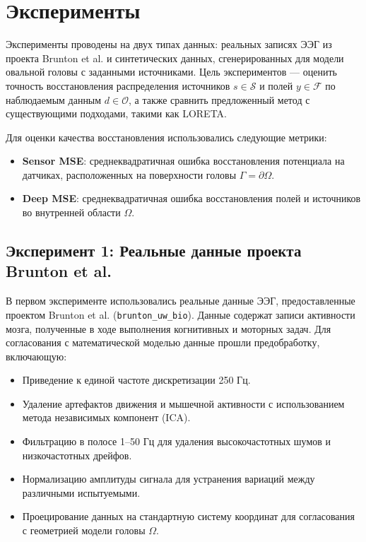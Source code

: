 \documentclass[sn-mathphys-num]{bst/sn-jnl}
\theoremstyle{thmstylethree}
\theoremstyle{thmstyletwo}
\theoremstyle{thmstyleone}
\begin{document}
\section{Эксперименты}
\label{sec:experiments}

Эксперименты проводены на двух типах данных: реальных записях ЭЭГ из проекта Brunton et al. и синтетических данных, сгенерированных для модели овальной головы с заданными источниками. Цель экспериментов --- оценить точность восстановления распределения источников $s \in \mathcal{S}$ и полей $y \in \mathcal{F}$ по наблюдаемым данным $d \in \mathcal{O}$, а также сравнить предложенный метод с существующими подходами, такими как LORETA.

Для оценки качества восстановления использовались следующие метрики:
\begin{itemize}
    \item \textbf{Sensor MSE}: среднеквадратичная ошибка восстановления потенциала на датчиках, расположенных на поверхности головы $\Gamma = \partial\Omega$.
    \item \textbf{Deep MSE}: среднеквадратичная ошибка восстановления полей и источников во внутренней области $\Omega$.
\end{itemize}

\subsection{Эксперимент 1: Реальные данные проекта Brunton et al.}
\label{subsec:exp1}

В первом эксперименте использовались реальные данные ЭЭГ, предоставленные проектом Brunton et al. (\texttt{brunton\_uw\_bio}). Данные содержат записи активности мозга, полученные в ходе выполнения когнитивных и моторных задач. Для согласования с математической моделью данные прошли предобработку, включающую:

\begin{itemize}
    \item Приведение к единой частоте дискретизации 250 Гц.
    \item Удаление артефактов движения и мышечной активности с использованием метода независимых компонент (ICA).
    \item Фильтрацию в полосе 1–50 Гц для удаления высокочастотных шумов и низкочастотных дрейфов.
    \item Нормализацию амплитуды сигнала для устранения вариаций между различными испытуемыми.
    \item Проецирование данных на стандартную систему координат для согласования с геометрией модели головы $\Omega$.
\end{itemize}
\end{document}
